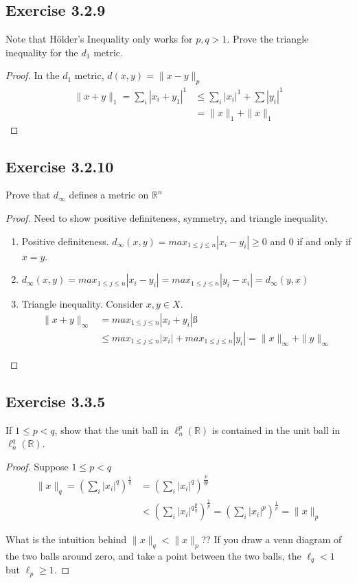 \documentclass{tufte-book}
\theoremstyle{mytheoremstyle}
\theoremstyle{mylemstyle}
\theoremstyle{mydefstyle}
\begin{document}
\subsection{Exercise 3.2.9}
Note that H{\"o}lder's Inequality only works for $p,q > 1$.  Prove the triangle inequality for the $d_1$ metric.

\begin{proof}
In the $d_1$ metric, $d(x,y) = \|x-y\|_p$
\begin{align*}
 \|x+y\|_1 = \sum_i|x_i+y_1|^1 &\leq \sum_i|x_i|^1 + \sum|y_i|^1 \\
 &= \|x\|_1 + \|x\|_1
\end{align*}
\end{proof}

\subsection{Exercise 3.2.10}
Prove that $d_\infty$ defines a metric on $\mathbb{R}^n$
\begin{proof}
Need to show positive definiteness, symmetry, and triangle inequality.
\begin{enumerate}
\item Positive definiteness. $d_\infty(x,y) = max_{1\leq j\leq n}|x_i-y_i| \geq 0$ and $0$ if and only if $x = y$.

\item $d_\infty(x,y) = max_{1\leq j\leq n}|x_i-y_i| =  max_{1\leq j\leq n}|y_i-x_i| =  d_\infty(y,x)$

\item Triangle inequality.  Consider $x, y \in X$.
\begin{align*}
\|x+y\|_\infty &= max_{1\leq j\leq n}|x_i+y_i|ß \\
&\leq max_{1\leq j\leq n}|x_i| + max_{1\leq j\leq n}|y_i| = \|x\|_\infty + \|y\|_\infty
\end{align*}
\end{enumerate}

\end{proof}

\subsection{Exercise 3.3.5}
If $1 \leq p < q$, show that the unit ball in $\ell_n^p(\mathbb{R})$ is contained in the unit ball in $\ell_n^q(\mathbb{R})$.
\begin{proof}
Suppose $1 \leq p < q$
\begin{align*}
\|x\|_q = (\sum_i|x_i|^q)^{\frac{1}{q}} &= (\sum_i|x_i|^q)^{\frac{p}{qp}} \\
&< (\sum_i|x_i|^{q\frac{p}{q}})^{\frac{1}{p}} = (\sum_i|x_i|^p)^{\frac{1}{p}} = \|x\|_p
\end{align*}

What is the intuition behind $\|x\|_q < \|x\|_p$??   If you draw a venn diagram of the two balls around zero, and take a point between the two balls, the $\ell_q < 1$ but $\ell_p \geq 1$. 

\end{proof}
\end{document}
